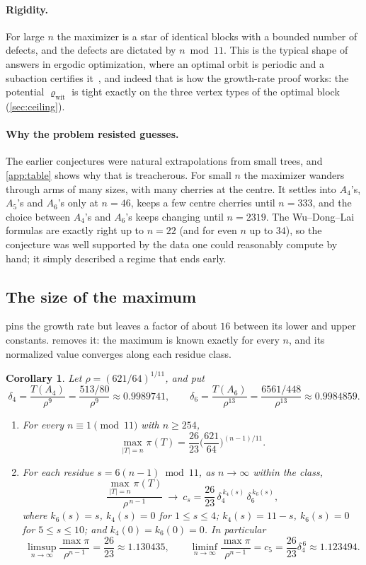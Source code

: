 \documentclass[11pt]{article}
\newtheorem{corollary}[theorem]{Corollary}
\theoremstyle{definition}
\begin{document}
\paragraph{Rigidity.} For large $n$ the maximizer is a star of identical blocks with a bounded number
of defects, and the defects are dictated by $n\bmod11$. This is the typical shape of answers in ergodic
optimization, where an optimal orbit is periodic and a subaction certifies it~\cite{Bousch2001,Jenkinson2019},
and indeed that is how the growth-rate proof works: the potential $\varrho_{\mathrm{wit}}$ is tight exactly
on the three vertex types of the optimal block (\cref{sec:ceiling}).

\paragraph{Why the problem resisted guesses.} The earlier conjectures were natural extrapolations from
small trees, and \cref{app:table} shows why that is treacherous. For small $n$ the maximizer wanders
through arms of many sizes, with many cherries at the centre. It settles into $A_4$'s, $A_5$'s and
$A_6$'s only at $n=46$, keeps a few centre cherries until $n=333$, and the choice between $A_4$'s and
$A_6$'s keeps changing until $n=2319$. The Wu--Dong--Lai formulas are exactly right up to $n=22$ (and for
even $n$ up to $34$), so the conjecture was well supported by the data one could reasonably compute by
hand; it simply described a regime that ends early.

\subsection{The size of the maximum}

 pins the growth rate but leaves a factor of about $16$ between its lower and upper
constants.  removes it: the maximum is known exactly for every $n$, and its normalized
value converges along each residue class.

\begin{corollary}\label{cor:constant}
Let $\rho=(621/64)^{1/11}$, and put
\[
  \delta_4=\frac{T(A_4)}{\rho^{9}}=\frac{513/80}{\rho^{9}}\approx0.9989741,\qquad
  \delta_6=\frac{T(A_6)}{\rho^{13}}=\frac{6561/448}{\rho^{13}}\approx0.9984859 .
\]
\begin{enumerate}
\item For every $n\equiv1\pmod{11}$ with $n\ge254$,
\[
  \max_{|T|=n}\pi(T)=\frac{26}{23}\Big(\frac{621}{64}\Big)^{(n-1)/11}.
\]
\item For each residue $s=6(n-1)\bmod11$, as $n\to\infty$ within the class,
\[
  \frac{\max_{|T|=n}\pi(T)}{\rho^{\,n-1}}\ \longrightarrow\ c_s=\frac{26}{23}\,\delta_4^{\,k_4(s)}\,\delta_6^{\,k_6(s)},
\]
where $k_6(s)=s$, $k_4(s)=0$ for $1\le s\le4$; $k_4(s)=11-s$, $k_6(s)=0$ for $5\le s\le10$; and
$k_4(0)=k_6(0)=0$. In particular
\[
  \limsup_{n\to\infty}\frac{\max\pi}{\rho^{n-1}}=\frac{26}{23}\approx1.130435,\qquad
  \liminf_{n\to\infty}\frac{\max\pi}{\rho^{n-1}}=c_5=\frac{26}{23}\delta_4^{\,6}\approx1.123494 .
\]
\end{enumerate}
\end{corollary}
\end{document}
